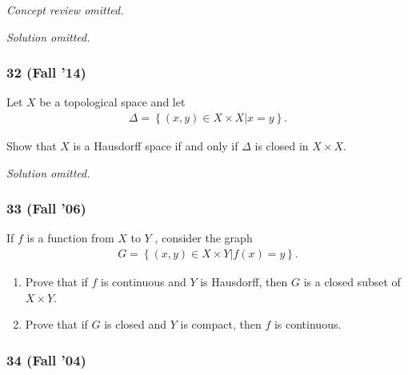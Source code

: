 \emph{Concept review omitted.}

\emph{Solution omitted.}

\hypertarget{fall-14-3}{%
\subsubsection{32 (Fall '14)}\label{fall-14-3}}

\begin{problem}[?]

Let \(X\) be a topological space and let
\begin{align*}
\Delta = \left\{{(x, y) \in X \times X \mathrel{\Big|}x = y}\right\}
.\end{align*}

Show that \(X\) is a Hausdorff space if and only if \(\Delta\) is closed
in \(X \times X\).

\end{problem}

\emph{Solution omitted.}

\hypertarget{fall-06}{%
\subsubsection{33 (Fall '06)}\label{fall-06}}

\begin{problem}[?]

If \(f\) is a function from \(X\) to \(Y\) , consider the graph
\begin{align*}
G = \left\{{(x, y) \in X \times Y \mathrel{\Big|}f (x) = y}\right\}
.\end{align*}

\begin{enumerate}
\def\labelenumi{\alph{enumi}.}
\item
  Prove that if \(f\) is continuous and \(Y\) is Hausdorff, then \(G\)
  is a closed subset of \(X \times Y\).
\item
  Prove that if \(G\) is closed and \(Y\) is compact, then \(f\) is
  continuous.
\end{enumerate}

\end{problem}

\hypertarget{fall-04}{%
\subsubsection{34 (Fall '04)}\label{fall-04}}

